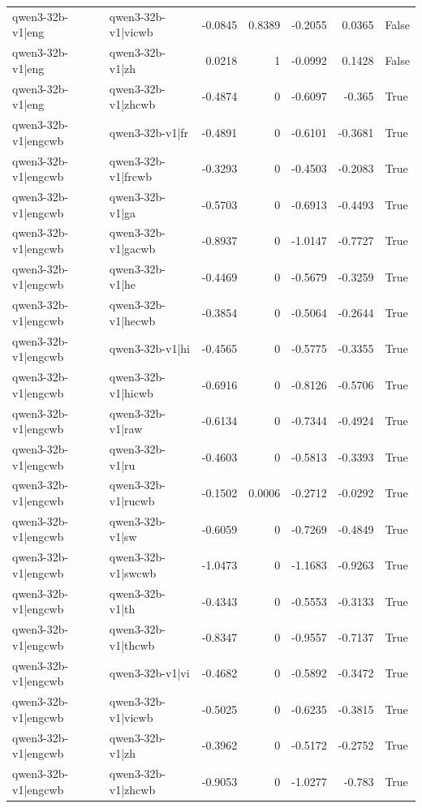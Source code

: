 \begin{table}
\begin{tabular}{l l r r r r l}
qwen3-32b-v1|eng & qwen3-32b-v1|vicwb & -0.0845 & 0.8389 & -0.2055 & 0.0365 & False \\
qwen3-32b-v1|eng & qwen3-32b-v1|zh & 0.0218 & 1 & -0.0992 & 0.1428 & False \\
qwen3-32b-v1|eng & qwen3-32b-v1|zhcwb & -0.4874 & 0 & -0.6097 & -0.365 & True \\
qwen3-32b-v1|engcwb & qwen3-32b-v1|fr & -0.4891 & 0 & -0.6101 & -0.3681 & True \\
qwen3-32b-v1|engcwb & qwen3-32b-v1|frcwb & -0.3293 & 0 & -0.4503 & -0.2083 & True \\
qwen3-32b-v1|engcwb & qwen3-32b-v1|ga & -0.5703 & 0 & -0.6913 & -0.4493 & True \\
qwen3-32b-v1|engcwb & qwen3-32b-v1|gacwb & -0.8937 & 0 & -1.0147 & -0.7727 & True \\
qwen3-32b-v1|engcwb & qwen3-32b-v1|he & -0.4469 & 0 & -0.5679 & -0.3259 & True \\
qwen3-32b-v1|engcwb & qwen3-32b-v1|hecwb & -0.3854 & 0 & -0.5064 & -0.2644 & True \\
qwen3-32b-v1|engcwb & qwen3-32b-v1|hi & -0.4565 & 0 & -0.5775 & -0.3355 & True \\
qwen3-32b-v1|engcwb & qwen3-32b-v1|hicwb & -0.6916 & 0 & -0.8126 & -0.5706 & True \\
qwen3-32b-v1|engcwb & qwen3-32b-v1|raw & -0.6134 & 0 & -0.7344 & -0.4924 & True \\
qwen3-32b-v1|engcwb & qwen3-32b-v1|ru & -0.4603 & 0 & -0.5813 & -0.3393 & True \\
qwen3-32b-v1|engcwb & qwen3-32b-v1|rucwb & -0.1502 & 0.0006 & -0.2712 & -0.0292 & True \\
qwen3-32b-v1|engcwb & qwen3-32b-v1|sw & -0.6059 & 0 & -0.7269 & -0.4849 & True \\
qwen3-32b-v1|engcwb & qwen3-32b-v1|swcwb & -1.0473 & 0 & -1.1683 & -0.9263 & True \\
qwen3-32b-v1|engcwb & qwen3-32b-v1|th & -0.4343 & 0 & -0.5553 & -0.3133 & True \\
qwen3-32b-v1|engcwb & qwen3-32b-v1|thcwb & -0.8347 & 0 & -0.9557 & -0.7137 & True \\
qwen3-32b-v1|engcwb & qwen3-32b-v1|vi & -0.4682 & 0 & -0.5892 & -0.3472 & True \\
qwen3-32b-v1|engcwb & qwen3-32b-v1|vicwb & -0.5025 & 0 & -0.6235 & -0.3815 & True \\
qwen3-32b-v1|engcwb & qwen3-32b-v1|zh & -0.3962 & 0 & -0.5172 & -0.2752 & True \\
qwen3-32b-v1|engcwb & qwen3-32b-v1|zhcwb & -0.9053 & 0 & -1.0277 & -0.783 & True \\

\end{tabular}
\end{table}
